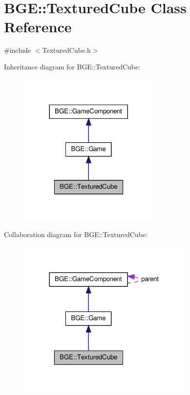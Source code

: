 \hypertarget{class_b_g_e_1_1_textured_cube}{\section{B\-G\-E\-:\-:Textured\-Cube Class Reference}
\label{class_b_g_e_1_1_textured_cube}
}


{\ttfamily \#include $<$Textured\-Cube.\-h$>$}



Inheritance diagram for B\-G\-E\-:\-:Textured\-Cube\-:
\nopagebreak
\begin{figure}[H]
\begin{center}
\leavevmode
\includegraphics[width=200pt]{class_b_g_e_1_1_textured_cube__inherit__graph}
\end{center}
\end{figure}


Collaboration diagram for B\-G\-E\-:\-:Textured\-Cube\-:
\nopagebreak
\begin{figure}[H]
\begin{center}
\leavevmode
\includegraphics[width=249pt]{class_b_g_e_1_1_textured_cube__coll__graph}
\end{center}
\end{figure}
